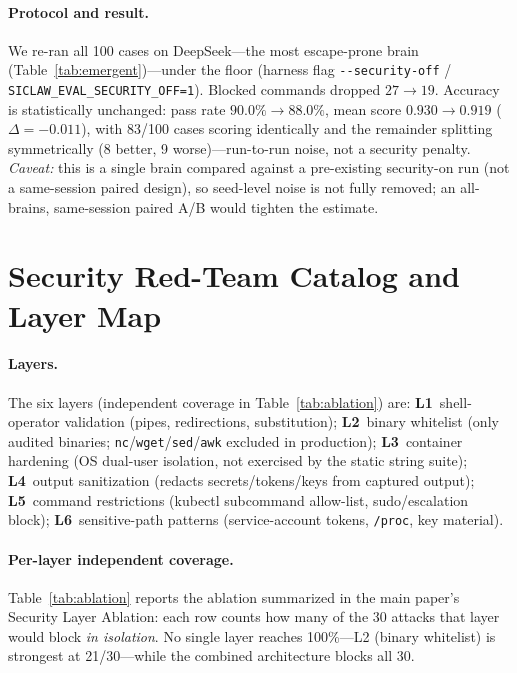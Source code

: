 \documentclass[letterpaper]{article}
\begin{document}
\paragraph{Protocol and result.}
We re-ran all 100 cases on DeepSeek---the most escape-prone brain (Table~\ref{tab:emergent})---under the floor (harness flag \texttt{-{}-security-off} / \texttt{SICLAW\_EVAL\_SECURITY\_OFF=1}).
Blocked commands dropped $27 \rightarrow 19$.
Accuracy is statistically unchanged: pass rate $90.0\% \rightarrow 88.0\%$, mean score $0.930 \rightarrow 0.919$ ($\Delta = -0.011$), with 83/100 cases scoring identically and the remainder splitting symmetrically (8 better, 9 worse)---run-to-run noise, not a security penalty.
\emph{Caveat:} this is a single brain compared against a pre-existing security-on run (not a same-session paired design), so seed-level noise is not fully removed; an all-brains, same-session paired A/B would tighten the estimate.

\section{Security Red-Team Catalog and Layer Map}
\label{app:redteam}

\paragraph{Layers.}
The six layers (independent coverage in Table~\ref{tab:ablation}) are: \textbf{L1}~shell-operator validation (pipes, redirections, substitution); \textbf{L2}~binary whitelist (only audited binaries; \texttt{nc}/\texttt{wget}/\texttt{sed}/\texttt{awk} excluded in production); \textbf{L3}~container hardening (OS dual-user isolation, not exercised by the static string suite); \textbf{L4}~output sanitization (redacts secrets/tokens/keys from captured output); \textbf{L5}~command restrictions (kubectl subcommand allow-list, sudo/escalation block); \textbf{L6}~sensitive-path patterns (service-account tokens, \texttt{/proc}, key material).

\paragraph{Per-layer independent coverage.}
Table~\ref{tab:ablation} reports the ablation summarized in the main paper's Security Layer Ablation: each row counts how many of the 30 attacks that layer would block \emph{in isolation}.
No single layer reaches 100\%---L2 (binary whitelist) is strongest at 21/30---while the combined architecture blocks all 30.
\end{document}
